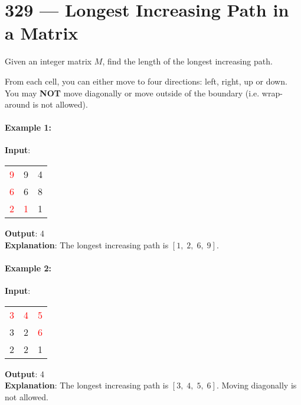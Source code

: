 \section{329 --- Longest Increasing Path in a Matrix}
Given an integer matrix $M$, find the length of the longest increasing path.
\par
From each cell, you can either move to four directions: left, right, up or down. You may \textbf{NOT} move diagonally or move outside of the boundary (i.e. wrap-around is not allowed).

\paragraph{Example 1:}

\begin{flushleft}
\textbf{Input}: 
\begin{table}[H]
\begin{tabular}{ccc}
\textcolor{red}{9} & 9 & 4 \\
\textcolor{red}{6} &6 & 8\\
\textcolor{red}{2}& \textcolor{red}{1} & 1
\end{tabular}
\end{table}
\textbf{Output}: 4
\\ 
\textbf{Explanation}: The longest increasing path is $[1,\; 2,\; 6,\; 9]$.
\end{flushleft}

\paragraph{Example 2:}

\begin{flushleft}
\textbf{Input}: 
\begin{table}[H]
\begin{tabular}{ccc}
\textcolor{red}{3} & \textcolor{red}{4} & \textcolor{red}{5} \\
3 &2 & \textcolor{red}{6}\\
2& 2 & 1
\end{tabular}
\end{table}
\textbf{Output}: 4 
\\
\textbf{Explanation}: The longest increasing path is $ [3,\; 4, \;5, \;6] $. Moving diagonally is not allowed.
\end{flushleft}
